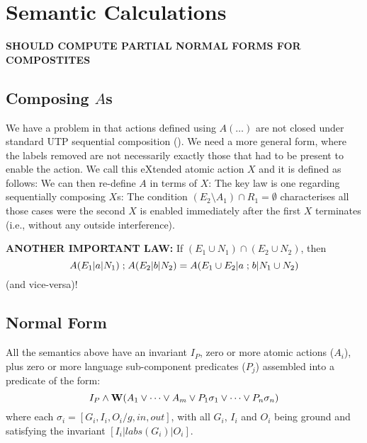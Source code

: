 \section{Semantic Calculations}\label{sec:calc}

\textbf{SHOULD COMPUTE PARTIAL NORMAL FORMS
FOR COMPOSTITES}

\subsection{Composing $A$s}\label{ssec:comp-A}

We have a problem in that actions defined using $A(\dots)$
are not closed under standard UTP sequential composition ().
We need a more general form,
where the labels removed are not necessarily
exactly those that had to be present to enable the action.
We call this eXtended atomic action $X$ and it is defined as follows:
We can then re-define $A$ in terms of $X$:
The key law is one regarding sequentially composing $X$s:
The condition $(E_2\setminus A_1) \cap R_1 = \emptyset$
characterises all those cases were the second $X$ is enabled
immediately after the first $X$ terminates
(i.e., without any outside interference).

\textbf{ANOTHER IMPORTANT LAW:}
If $(E_1 \cup N_1) \cap (E_2 \cup N_2)$, then
\[
  A(E_1|a|N_1) \mathrel{;} A(E_2|b|N_2)
  =
  A(E_1\cup E_2|a\mathrel{;} b|N_1\cup N_2)
\]
(and vice-versa)!

\subsection{Normal Form}\label{sec:normal-form}

All the semantics above have an invariant $I_P$,
zero or more atomic actions ($A_i$),
plus zero or more language sub-component predicates ($P_j$)
assembled into a predicate of the form:
\[
  I_P
  \land
  \mathbf{W}( A_1 \lor \dots \lor A_m
     \lor
     P_1\sigma_1 \lor \dots \lor P_n\sigma_n )
\]
where each $\sigma_i = [G_i,I_i,O_i/g,in,out]$,
with all $G_i$, $I_i$ and $O_i$ being ground
and satisfying the invariant $[I_i|labs(G_i)|O_i]$.

